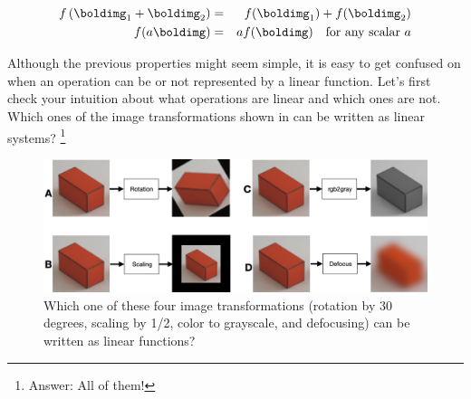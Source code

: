 \begin{eqnarray}
	f\left( \boldimg_1+\boldimg_2 \right) &=& f(\boldimg_1)+ f(\boldimg_2) \\ \nonumber
	f(a\boldimg) &=& af(\boldimg) ~~\text{~for any scalar~} a
\end{eqnarray}

Although the previous properties might seem simple, it is easy to get confused on when an operation can be or not represented by a linear function. Let's first check your intuition about what operations are linear and which ones are not. Which ones of the image transformations shown in \fig{\ref{fig:transformationsquizz}} can be written as linear systems? \footnote{Answer: All of them!}


\begin{figure}[t]
	\centerline{
		\includegraphics[width=1\linewidth]{figures/linear_image_filtering/whichoneislinear.png}
	}
	\caption{Which one of these four image transformations (rotation by 30 degrees, scaling by 1/2, color to grayscale, and defocusing) can be written as linear functions?}
	\label{fig:transformationsquizz}
\end{figure}

